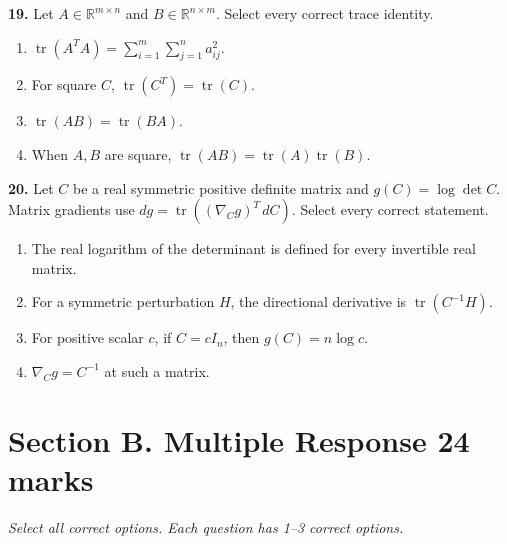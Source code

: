 \documentclass[11pt,a4paper]{article}
\begin{document}
\par\noindent\begin{minipage}{\linewidth}
\textbf{19.} Let \(A\in\mathbb R^{m\times n}\) and \(B\in\mathbb R^{n\times m}\). Select every correct trace identity.
\begin{enumerate}[label=(\Alph*),leftmargin=8mm,itemsep=2pt,topsep=2pt]
\item \(\operatorname{tr}(A^TA)=\sum_{i=1}^m\sum_{j=1}^n a_{ij}^2\).
\item For square \(C\), \(\operatorname{tr}(C^T)=\operatorname{tr}(C)\).
\item \(\operatorname{tr}(AB)=\operatorname{tr}(BA)\).
\item When \(A,B\) are square, \(\operatorname{tr}(AB)=\operatorname{tr}(A)\operatorname{tr}(B)\).
\end{enumerate}

\end{minipage}\par\vspace{3mm}
\par\noindent\begin{minipage}{\linewidth}
\textbf{20.} Let \(C\) be a real symmetric positive definite matrix and \(g(C)=\log\det C\). Matrix gradients use \(dg=\operatorname{tr}((\nabla_Cg)^T\,dC)\). Select every correct statement.
\begin{enumerate}[label=(\Alph*),leftmargin=8mm,itemsep=2pt,topsep=2pt]
\item The real logarithm of the determinant is defined for every invertible real matrix.
\item For a symmetric perturbation \(H\), the directional derivative is \(\operatorname{tr}(C^{-1}H)\).
\item For positive scalar \(c\), if \(C=cI_n\), then \(g(C)=n\log c\).
\item \(\nabla_C g=C^{-1}\) at such a matrix.
\end{enumerate}

\end{minipage}\par\vspace{3mm}
\newpage\section*{Section B. Multiple Response \hfill 24 marks}
\textit{Select all correct options. Each question has 1--3 correct options.}\par
\end{document}
